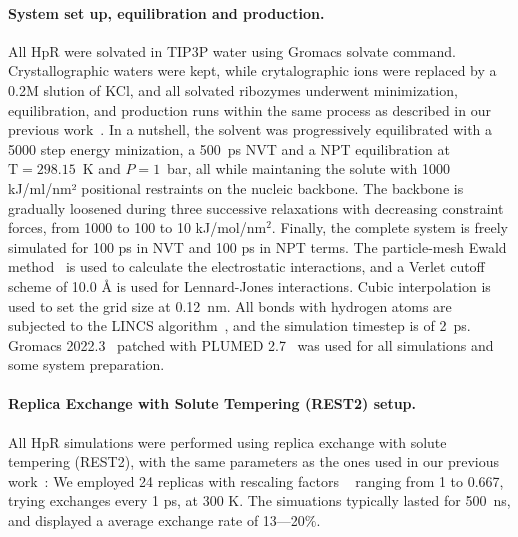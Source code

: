\documentclass[journal=jacsat,manuscript=article]{achemso}
\begin{document}


\paragraph{System set up, equilibration and production.}
All HpR were solvated in TIP3P water using Gromacs {\selectfont solvate} command. 
Crystallographic waters were kept, while crytalographic ions were replaced by a 0.2M slution of KCl,  
and all solvated ribozymes underwent minimization, equilibration, and production runs within the same process as described in our previous work~\cite{forget2024simulation}.
In a nutshell, the solvent was progressively equilibrated with a 5000 step energy minization, a 500~ps NVT and a NPT equilibration at $\mathrm{T}= 298.15$~K 
and $P=1$~bar, all while maintaning the solute with 1000 kJ/ml/nm² positional restraints on the nucleic backbone.
The backbone is gradually loosened during three successive relaxations with decreasing constraint forces, from 1000 to 100 to 10 kJ/mol/nm$^2$.
Finally, the complete system is freely simulated for 100 ps in NVT and 100 ps in NPT terms. 
The particle-mesh Ewald method~\cite{darden_particle_1993} is used to calculate the electrostatic interactions, and a Verlet cutoff scheme of 10.0 Å is used for Lennard-Jones interactions. 
Cubic interpolation is used to set the grid size at 0.12~nm.
All bonds with hydrogen atoms are subjected to the LINCS algorithm~\cite{hess_lincs_1997}, and the simulation timestep is of 2~ps. 
Gromacs 2022.3~\cite{abraham_gromacs_2015} patched with PLUMED 2.7~\cite{tribello_plumed_2014, the_plumed_consortium_promoting_2019} was used for all simulations and some system preparation. 

\paragraph{Replica Exchange with Solute Tempering (REST2) setup.}
All HpR simulations were performed using replica exchange with solute tempering (REST2)\cite{liu_replica_2005, wang_replica_2015},
with the same parameters as the ones used in our previous work~\cite{forget2024simulation}:
We employed 24 replicas with rescaling factors ~ ranging from 1 to 0.667, trying exchanges every 1 ps, at 300 K.
The simuations typically lasted for 500~ns, and displayed a average exchange rate of 13---20$\%$.  
\end{document}
